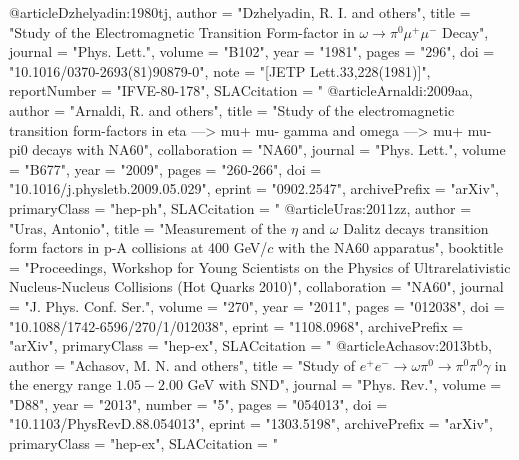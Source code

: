 @article{Dzhelyadin:1980tj,
      author         = "Dzhelyadin, R. I. and others",
      title          = "{Study of the Electromagnetic Transition Form-factor in
                        $\omega \to \pi^0 \mu^+ \mu^-$ Decay}",
      journal        = "Phys. Lett.",
      volume         = "B102",
      year           = "1981",
      pages          = "296",
      doi            = "10.1016/0370-2693(81)90879-0",
      note           = "[JETP Lett.33,228(1981)]",
      reportNumber   = "IFVE-80-178",
      SLACcitation   = "%
}
@article{Arnaldi:2009aa,
      author         = "Arnaldi, R. and others",
      title          = "{Study of the electromagnetic transition form-factors in
                        eta ---> mu+ mu- gamma and omega ---> mu+ mu- pi0 decays
                        with NA60}",
      collaboration  = "NA60",
      journal        = "Phys. Lett.",
      volume         = "B677",
      year           = "2009",
      pages          = "260-266",
      doi            = "10.1016/j.physletb.2009.05.029",
      eprint         = "0902.2547",
      archivePrefix  = "arXiv",
      primaryClass   = "hep-ph",
      SLACcitation   = "%
}
@article{Uras:2011zz,
      author         = "Uras, Antonio",
      title          = "{Measurement of the $\eta$ and $\omega$ Dalitz decays
                        transition form factors in p-A collisions at 400 GeV/$c$
                        with the NA60 apparatus}",
      booktitle      = "{Proceedings, Workshop for Young Scientists on the
                        Physics of Ultrarelativistic Nucleus-Nucleus Collisions
                        (Hot Quarks 2010)}",
      collaboration  = "NA60",
      journal        = "J. Phys. Conf. Ser.",
      volume         = "270",
      year           = "2011",
      pages          = "012038",
      doi            = "10.1088/1742-6596/270/1/012038",
      eprint         = "1108.0968",
      archivePrefix  = "arXiv",
      primaryClass   = "hep-ex",
      SLACcitation   = "%
}
@article{Achasov:2013btb,
      author         = "Achasov, M. N. and others",
      title          = "{Study of $e^+e^- \to \omega\pi^0 \to \pi^0\pi^0\gamma$
                        in the energy range $1.05-2.00$ GeV with SND}",
      journal        = "Phys. Rev.",
      volume         = "D88",
      year           = "2013",
      number         = "5",
      pages          = "054013",
      doi            = "10.1103/PhysRevD.88.054013",
      eprint         = "1303.5198",
      archivePrefix  = "arXiv",
      primaryClass   = "hep-ex",
      SLACcitation   = "%
}
